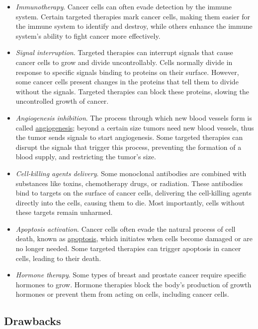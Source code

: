 \begin{itemize}
    \item \textit{Immunotherapy}. Cancer cells can often evade detection by the immune system. Certain targeted therapies mark cancer cells, making them easier for the immune system to identify and destroy, while others enhance the immune system's ability to fight cancer more effectively.
    \item \textit{Signal interruption}. Targeted therapies can interrupt signals that cause cancer cells to grow and divide uncontrollably. Cells normally divide in response to specific signals binding to proteins on their surface. However, some cancer cells present changes in the proteins that tell them to divide without the signals. Targeted therapies can block these proteins, slowing the uncontrolled growth of cancer.
    \item \textit{Angiogenesis inhibition}. The process through which new blood vessels form is called \href{https://en.wikipedia.org/wiki/Angiogenesis}{angiogenesis}; beyond a certain size tumors need new blood vessels, thus the tumor sends signals to start angiogenesis. Some targeted therapies can disrupt the signals that trigger this process, preventing the formation of a blood supply, and restricting the tumor's size. 
    \item \textit{Cell-killing agents delivery}. Some monoclonal antibodies are combined with substances like toxins, chemotherapy drugs, or radiation. These antibodies bind to targets on the surface of cancer cells, delivering the cell-killing agents directly into the cells, causing them to die. Most importantly, cells without these targets remain unharmed.
    \item \textit{Apoptosis activation}. Cancer cells often evade the natural process of cell death, known as \href{https://en.wikipedia.org/wiki/Apoptosis}{apoptosis}, which initiates when cells become damaged or are no longer needed. Some targeted therapies can trigger apoptosis in cancer cells, leading to their death.
    \item \textit{Hormone therapy}. Some types of breast and prostate cancer require specific hormones to grow. Hormone therapies block the body's production of growth hormones or prevent them from acting on cells, including cancer cells.
\end{itemize}

\subsection{Drawbacks}

